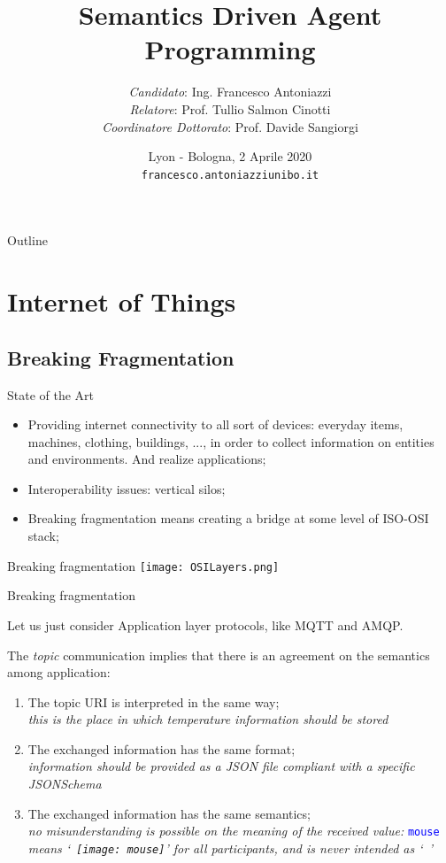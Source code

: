 \documentclass{beamer}
\title{Semantics Driven Agent Programming}
\author[Francesco Antoniazzi]{\textit{Candidato}: Ing. Francesco Antoniazzi \\
\textit{Relatore}: Prof. Tullio Salmon Cinotti \\
\textit{Coordinatore Dottorato}: Prof. Davide Sangiorgi}
\date{Lyon - Bologna, 2 Aprile 2020\\\vspace{5mm} \footnotesize{\texttt{francesco.antoniazzi}\faAt \texttt{unibo.it}}}
\institute{Dottorato in Computer Science and Engineering - XXXII ciclo \\ Alma Mater Studiorum Università di Bologna}
\begin{document}
\maketitle

\begin{frame}{Outline}
\tableofcontents
\end{frame}

\section{Internet of Things}
\subsection{Breaking Fragmentation}
\begin{frame}{State of the Art}
\begin{itemize}
    \item Providing internet connectivity to all sort of devices: everyday items, machines, clothing, buildings, ...,  in order to collect information on entities and environments. And realize applications;
    \item Interoperability issues: vertical silos;
    \item Breaking fragmentation means creating a bridge at some level of ISO-OSI stack;
\end{itemize}
\end{frame}

\begin{frame}{Breaking fragmentation}
\texttt{[image: OSILayers.png]}
\end{frame}

\begin{frame}{Breaking fragmentation}
\begin{flushleft}
Let us just consider Application layer protocols, like MQTT and AMQP. 

The \textit{topic} communication implies that there is an agreement on the semantics among application:
\begin{enumerate}
    \item<1-> The topic URI is interpreted in the same way; \\
    \textit{this is the place in which temperature information should be stored}
    \item<2-> The exchanged information has the same format; \\
    \textit{information should be provided as a JSON file compliant with a specific JSONSchema}
    \item<3-> The exchanged information has the same semantics; \\
    \textit{no misunderstanding is possible on the meaning of the received value: }\textcolor{blue}{\texttt{mouse}} \textit{means `~\texttt{[image: mouse]}' for all participants, and is never intended as `~\faMousePointer'}
\end{enumerate}
\end{flushleft}
\end{frame}
\end{document}
